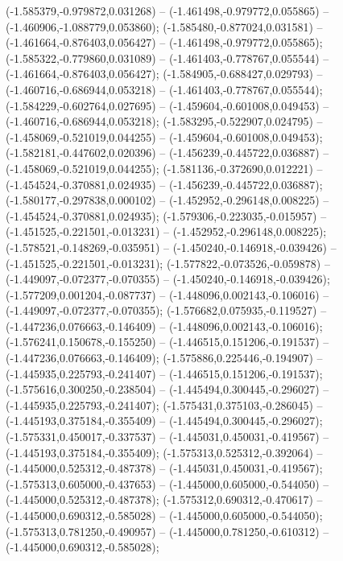  (-1.585379,-0.979872,0.031268) -- (-1.461498,-0.979772,0.055865) -- (-1.460906,-1.088779,0.053860);
 (-1.585480,-0.877024,0.031581) -- (-1.461664,-0.876403,0.056427) -- (-1.461498,-0.979772,0.055865);
 (-1.585322,-0.779860,0.031089) -- (-1.461403,-0.778767,0.055544) -- (-1.461664,-0.876403,0.056427);
 (-1.584905,-0.688427,0.029793) -- (-1.460716,-0.686944,0.053218) -- (-1.461403,-0.778767,0.055544);
 (-1.584229,-0.602764,0.027695) -- (-1.459604,-0.601008,0.049453) -- (-1.460716,-0.686944,0.053218);
 (-1.583295,-0.522907,0.024795) -- (-1.458069,-0.521019,0.044255) -- (-1.459604,-0.601008,0.049453);
 (-1.582181,-0.447602,0.020396) -- (-1.456239,-0.445722,0.036887) -- (-1.458069,-0.521019,0.044255);
 (-1.581136,-0.372690,0.012221) -- (-1.454524,-0.370881,0.024935) -- (-1.456239,-0.445722,0.036887);
 (-1.580177,-0.297838,0.000102) -- (-1.452952,-0.296148,0.008225) -- (-1.454524,-0.370881,0.024935);
 (-1.579306,-0.223035,-0.015957) -- (-1.451525,-0.221501,-0.013231) -- (-1.452952,-0.296148,0.008225);
 (-1.578521,-0.148269,-0.035951) -- (-1.450240,-0.146918,-0.039426) -- (-1.451525,-0.221501,-0.013231);
 (-1.577822,-0.073526,-0.059878) -- (-1.449097,-0.072377,-0.070355) -- (-1.450240,-0.146918,-0.039426);
 (-1.577209,0.001204,-0.087737) -- (-1.448096,0.002143,-0.106016) -- (-1.449097,-0.072377,-0.070355);
 (-1.576682,0.075935,-0.119527) -- (-1.447236,0.076663,-0.146409) -- (-1.448096,0.002143,-0.106016);
 (-1.576241,0.150678,-0.155250) -- (-1.446515,0.151206,-0.191537) -- (-1.447236,0.076663,-0.146409);
 (-1.575886,0.225446,-0.194907) -- (-1.445935,0.225793,-0.241407) -- (-1.446515,0.151206,-0.191537);
 (-1.575616,0.300250,-0.238504) -- (-1.445494,0.300445,-0.296027) -- (-1.445935,0.225793,-0.241407);
 (-1.575431,0.375103,-0.286045) -- (-1.445193,0.375184,-0.355409) -- (-1.445494,0.300445,-0.296027);
 (-1.575331,0.450017,-0.337537) -- (-1.445031,0.450031,-0.419567) -- (-1.445193,0.375184,-0.355409);
 (-1.575313,0.525312,-0.392064) -- (-1.445000,0.525312,-0.487378) -- (-1.445031,0.450031,-0.419567);
 (-1.575313,0.605000,-0.437653) -- (-1.445000,0.605000,-0.544050) -- (-1.445000,0.525312,-0.487378);
 (-1.575312,0.690312,-0.470617) -- (-1.445000,0.690312,-0.585028) -- (-1.445000,0.605000,-0.544050);
 (-1.575313,0.781250,-0.490957) -- (-1.445000,0.781250,-0.610312) -- (-1.445000,0.690312,-0.585028);
